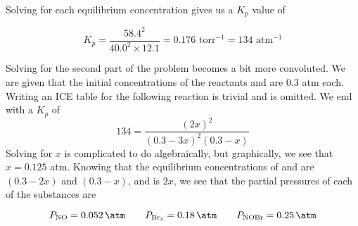 \documentclass[11 pt]{article}
\begin{document}
    Solving for each equilibrium concentration gives us a $K_p$ value of 
    \begin{answerBox}
          $$K_p = \frac{58.4^2}{40.0^2 \times 12.1} = 0.176 \text{ torr}^{-1} = 134 \text{ atm}^{-1}$$
    \end{answerBox}
    Solving for the second part of the problem becomes a bit more convoluted. We are given that the initial concentrations of the reactants  and  are 
    0.3 atm each. Writing an ICE table for the following reaction is trivial and is omitted. We end with a $K_p$ of 
    $$134 =  \frac{(2x)^2}{(0.3-3x)^2(0.3-x)}$$
    Solving for $x$ is complicated to do algebraically, but graphically, we see that $x = 0.125$ atm. Knowing
    that the equilibrium concentrations of  and  are $(0.3 - 2x)$ and $(0.3 - x)$, and 
     is $2x$, we see that the partial pressures of each of the substances are
    \begin{answerBox}
      $$ P_{\ce{NO}} = \SI{0.052}{\atm} \qquad P_{\ce{Br2}} = \SI{0.18}{\atm} \qquad P_{\ce{NOBr}} = \SI{0.25}{\atm}$$
    \end{answerBox}
\end{document}
